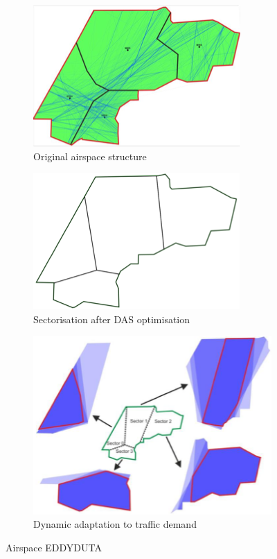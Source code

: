 \begin{figure}[!ht]
    \centering
    \begin{subfigure}{.45\textwidth}
        \centering
        \includegraphics[width=.7\textwidth]{img/airspace.png}
        \caption{Original airspace structure}
        \label{airspace-normal}
    \end{subfigure}
    \begin{subfigure}{.45\textwidth}
        \centering
        \includegraphics[width=.7\textwidth]{img/airspace-das.png}
        \caption{Sectorisation after \gls{DAS} optimisation}
        \label{airspace-das}
    \end{subfigure}

    \begin{subfigure}{\textwidth}
        \centering
        \includegraphics[width=.6\textwidth]{img/airspace-dynamic.png}
        \caption{Dynamic adaptation to traffic demand}
        \label{airspace-dynamic}
    \end{subfigure}

    \caption{Airspace EDDYDUTA \cite{Schultz_2018}}
    \label{airspace}
\end{figure}

